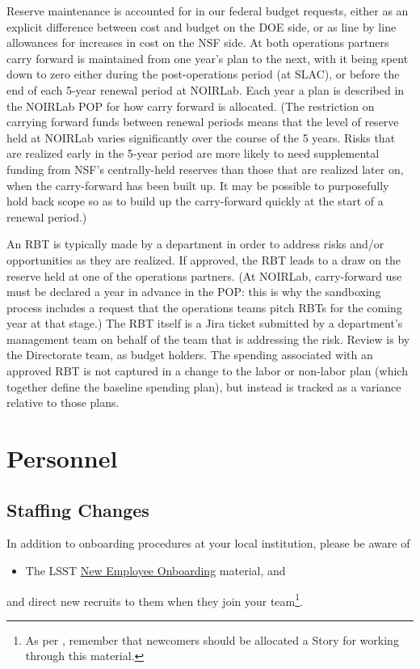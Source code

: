 Reserve maintenance is accounted for in our federal budget requests, either as an explicit difference between cost and budget on the \gls{DOE} side, or as line by line allowances for increases in cost on the \gls{NSF} side.
At both operations partners carry forward is maintained from one year's plan to the next, with it being spent down to zero either during the post-operations period (at \gls{SLAC}), or before the end of each 5-year renewal period at \gls{NOIRLab}.
Each year a plan is described in the \gls{NOIRLab} \gls{POP} for how carry forward is allocated.
(The restriction on carrying forward funds between renewal periods means that the level of reserve held at \gls{NOIRLab} varies significantly over the course of the 5 years.
Risks that are realized early in the 5-year period are more likely to need supplemental funding from \gls{NSF}'s centrally-held reserves than those that are realized later on, when the carry-forward has been built up.
It may be possible to purposefully hold back scope so as to build up the carry-forward quickly at the start of a renewal period.)

An \gls{RBT} is typically made by a department in order to address risks and/or opportunities as they are realized.
If approved, the \gls{RBT} leads to a draw on the reserve held at one of the operations partners.
(At \gls{NOIRLab}, carry-forward use must be declared a year in advance in the \gls{POP}: this is why the sandboxing process includes a request that the operations teams pitch \glspl{RBT} for the coming year at that stage.)
The \gls{RBT} itself is a Jira ticket submitted by a department's management team on behalf of the team that is addressing the risk.
\gls{Review} is by the Directorate team, as budget holders.
The spending associated with an approved \gls{RBT} is not captured in a change to the labor or non-labor plan (which together define the baseline spending plan), but instead is tracked as a variance relative to those plans.

\section{Personnel}

\subsection{Staffing Changes}
\label{sec:staffing}

In addition to onboarding procedures at your local institution, please
be aware of
\begin{itemize}
\item The \gls{LSST} \href{https://project.lsst.org/onboarding}{New Employee
  Onboarding} material, and
\end{itemize}
and direct new recruits to them when they join your team\footnote{As per , remember that newcomers should be allocated a Story for working through this material.}.

